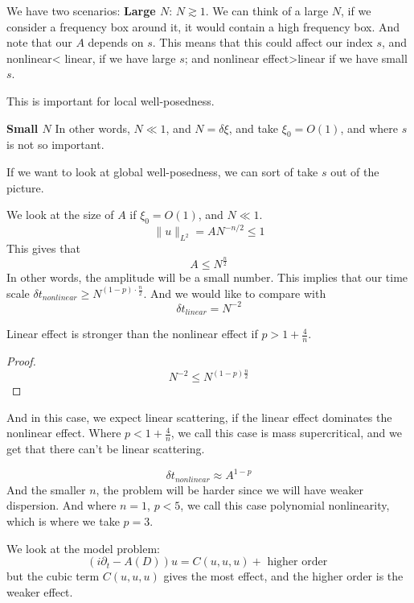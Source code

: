 We have two scenarios:
\textbf{Large $N$}:
$N\gtrsim 1$. We can think of a large $N$, if we consider a frequency box around it, it would contain a high frequency box. And note that our $A$ depends on $s$. This means that this could affect our index $s$, and nonlinear< linear, if we have large $s$; and nonlinear effect>linear if we have small $s$.
\begin{note}
This is important for local well-posedness.
\end{note}
\textbf{Small $N$}
In other words, $N\ll 1$, and $N=\delta\xi$, and take $\xi_0=O(1)$, and where $s$ is not so important.
\begin{note}
    If we want to look at global well-posedness, we can sort of take $s$ out of the picture.
\end{note}
We look at the size of $A$ if $\xi_0=O(1)$, and $N\ll 1$.
\begin{equation*}
    \|u\|_{L^2}=AN^{-n/2}\leq 1
\end{equation*}
This gives that
\begin{equation*}
    A\leq N^\frac{n}{2}
\end{equation*}
In other words, the amplitude will be a small number. This implies that our time scale $\delta t_{nonlinear}\geq N^{(1-p)\cdot\frac{n}{2}}$. And we would like to compare with 
\begin{equation*}
    \delta t_{linear}=N^{-2}
\end{equation*}
\begin{corollary}
    Linear effect is stronger than the nonlinear effect if $p>1+\frac{4}{n}$.
\end{corollary}
\begin{proof}
    \begin{equation*}
        N^{-2}\leq N^{(1-p)\frac{n}{2}}
    \end{equation*}
\end{proof}
And in this case, we expect linear scattering, if the linear effect dominates the nonlinear effect. Where $p<1+\frac{4}{n}$, we call this case is mass supercritical, and we get that there can't be linear scattering.

\begin{equation*}
    \delta t_{nonlinear}\approx A^{1-p}
\end{equation*}
And the smaller $n$, the problem will be harder since we will have weaker dispersion. And where $n=1$, $p<5$, we call this case polynomial nonlinearity, which is where we take $p=3$.

We look at the model problem:
\begin{equation*}
    (i\partial_t-A(D))u=C(u,u,u)+ \text{ higher order }
\end{equation*}
but the cubic term $C(u,u,u)$ gives the most effect, and the higher order is the weaker effect.

